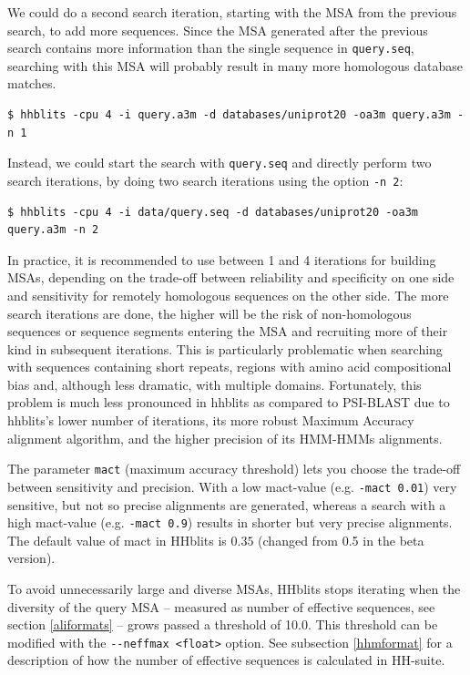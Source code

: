\documentclass[11pt,a4paper]{article}
\begin{document}
We could do a second search iteration, starting with the MSA from the previous search, to add more sequences. Since the MSA generated after the previous search contains more information than the single sequence in \verb`query.seq`, searching with this MSA will probably result in many more homologous database matches.
\begin{verbatim}
$ hhblits -cpu 4 -i query.a3m -d databases/uniprot20 -oa3m query.a3m -n 1
\end{verbatim}

Instead, we could start the search with \verb`query.seq` and directly perform two search iterations, by doing two search iterations using the option \verb`-n 2`:
\begin{verbatim}
$ hhblits -cpu 4 -i data/query.seq -d databases/uniprot20 -oa3m query.a3m -n 2 
\end{verbatim}

In practice, it is recommended to use between 1 and 4 iterations for building MSAs, depending on the trade-off between reliability and specificity on one side and sensitivity for remotely homologous sequences on the other side. The more search iterations are done, the higher will be the risk of non-homologous sequences or sequence segments entering the MSA and recruiting more of their kind in subsequent iterations. This is particularly problematic when searching with sequences containing short repeats, regions with amino acid compositional bias and, although less dramatic,  with multiple domains. Fortunately, this problem is much less pronounced in hhblits as compared to PSI-BLAST due to hhblits's lower number of iterations, its more robust Maximum Accuracy alignment algorithm, and the higher precision of its HMM-HMMs alignments. 

The parameter \verb`mact` (maximum accuracy threshold) lets you choose the trade-off between sensitivity and 
precision. With a low mact-value (e.g. \verb`-mact 0.01`) very sensitive, but not 
so precise alignments are generated, whereas a search with a high mact-value (e.g. \verb`-mact 0.9`) 
results in shorter but very precise alignments. The default value of mact in HHblits is $0.35$ 
(changed from 0.5 in the beta version). 

To avoid unnecessarily large and diverse MSAs, HHblits stops iterating when the diversity of the query MSA -- measured as number of effective sequences, see section \ref{aliformats} -- grows passed a threshold of 10.0. This threshold can be modified with the \verb`--neffmax <float>` option. See subsection \ref{hhmformat} for a description of how the number of effective sequences is calculated in HH-suite.
\end{document}
